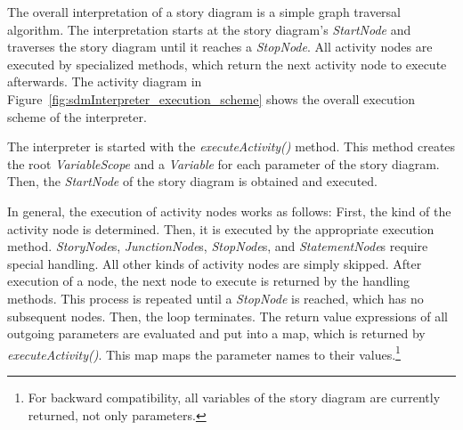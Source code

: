 The overall interpretation of a story diagram is a simple graph traversal algorithm.
The interpretation starts at the story diagram's \emph{StartNode} and traverses the story diagram until it reaches a \emph{StopNode}. 
All activity nodes are executed by specialized methods, which return the next activity node to execute afterwards. The activity diagram in Figure~\ref{fig:sdmInterpreter_execution_scheme} shows the overall execution scheme of the interpreter.

The interpreter is started with the \emph{executeActivity()} method.
This method creates the root \emph{VariableScope} and a \emph{Variable} for each parameter of the story diagram.
Then, the \emph{StartNode} of the story diagram is obtained and executed.

In general, the execution of activity nodes works as follows: 
First, the kind of the activity node is determined. Then, it is executed by the appropriate execution method.
\emph{StoryNode}s, \emph{JunctionNode}s, \emph{StopNode}s, and \emph{StatementNode}s require special handling.
All other kinds of activity nodes are simply skipped.
After execution of a node, the next node to execute is returned by the handling methods.
This process is repeated until a \emph{StopNode} is reached, which has no subsequent nodes.
Then, the loop terminates. The return value expressions of all outgoing parameters are evaluated and put into a map, which is returned by \emph{executeActivity()}.
This map maps the parameter names to their values.\footnote{For backward compatibility, all variables of the story diagram are currently returned, not only parameters.}

